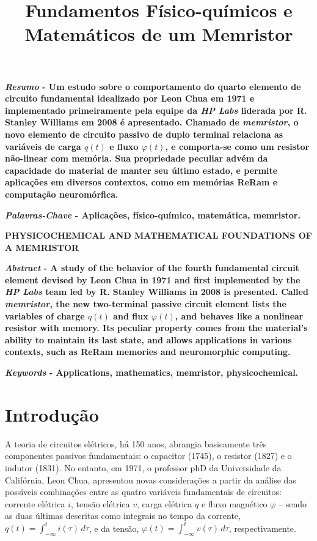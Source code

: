\documentclass{ceel}
\title{Fundamentos Físico-químicos e Matemáticos de um Memristor}
\begin{document}
\inserirtitulo
\vspace{3cm}

\begin{multicols}{2}

\textbf{\emph{Resumo} - Um estudo sobre o comportamento do quarto elemento de circuito fundamental idealizado por Leon Chua em 1971 e implementado primeiramente pela equipe da \emph{HP Labs} liderada por R. Stanley Williams em 2008 é apresentado. Chamado de \emph{memristor}, o novo elemento de circuito passivo de duplo terminal relaciona as variáveis de carga $q(t)$ e fluxo $\varphi(t)$, e comporta-se como um resistor não-linear com memória. Sua propriedade peculiar advém da capacidade do material de manter seu último estado, e permite aplicações em diversos contextos, como em memórias ReRam e computação neuromórfica.} %
\vspace*{10pt}

\textbf{\emph{Palavras-Chave} - Aplicações, físico-químico, matemática, memristor.}


\begin{center}

\noindent\textbf{\large \uppercase{Physicochemical and Mathematical Foundations of a Memristor}}
\end{center}

\textbf{\emph{Abstract} - A study of the behavior of the fourth fundamental circuit element devised by Leon Chua in 1971 and first implemented by the \emph{HP Labs} team led by R. Stanley Williams in 2008 is presented. Called \emph {memristor}, the new two-terminal passive circuit element lists the variables of charge $q(t)$ and flux $\varphi(t)$, and behaves like a nonlinear resistor with memory. Its peculiar property comes from the material's ability to maintain its last state, and allows applications in various contexts, such as ReRam memories and neuromorphic computing.}
\vspace*{10pt}

\textbf{\emph{Keywords} - Applications, mathematics, memristor, physicochemical.}


\section{Introdução}
A teoria de circuitos elétricos, há 150 anos, abrangia basicamente três componentes passivos fundamentais: o capacitor (1745), o resistor (1827) e o indutor (1831). No entanto, em 1971, o professor phD da Universidade da Califórnia, Leon Chua, apresentou novas considerações a partir da análise das possíveis combinações entre as quatro variáveis fundamentais de circuitos: corrente elétrica $i$, tensão elétrica $v$, carga elétrica $q$ e fluxo magnético $\varphi$ – sendo as duas últimas descritas como integrais no tempo da corrente, $q(t)=\int_{-\infty}^t i(\tau)\, d\tau$, e da tensão, $\varphi(t)=\int_{-\infty}^t v(\tau)\, d\tau$, respectivamente.


\end{multicols}
\end{document}
